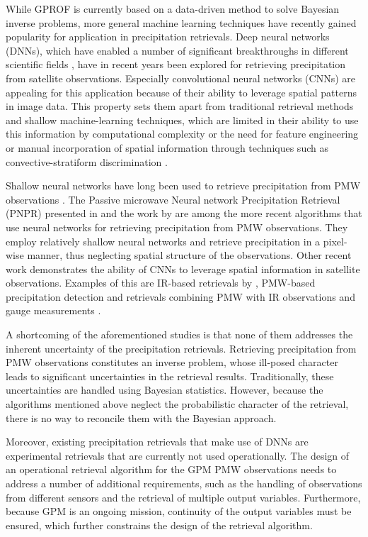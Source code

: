 \documentclass[journal abbreviation, manuscript]{copernicus}
\begin{document}
While GPROF is currently based on a data-driven method to solve Bayesian inverse
problems, more general machine learning techniques have recently gained
popularity for application in precipitation retrievals. Deep neural networks
(DNNs), which have enabled a number of significant breakthroughs in different
scientific fields \citep{silver16, jumper21}, have in recent years been explored
for retrieving precipitation from satellite observations. Especially
convolutional neural networks (CNNs) are appealing for this application because
of their ability to leverage spatial patterns in image data. This property sets
them apart from traditional retrieval methods and shallow machine-learning
techniques, which are limited in their ability to use this information by
computational complexity \citep{duncan19} or the need for feature engineering or
manual incorporation of spatial information through techniques such as
convective-stratiform discrimination \citep{kaushik10}.

Shallow neural networks have long been used to retrieve precipitation
from PMW observations \citep{staelin00, surssavadee08}. The Passive microwave
Neural network Precipitation Retrieval (PNPR) presented in \citet{sano15,
  sano16, sano18} and the work by \citet{tang18} are among the more recent
algorithms that use neural networks for retrieving precipitation from PMW
observations. They employ relatively shallow neural networks and retrieve
precipitation in a pixel-wise manner, thus neglecting spatial structure of the
observations. Other recent work demonstrates the ability of  CNNs to
leverage spatial information in  satellite observations. Examples of this are
IR-based retrievals by \citet{sadeghi19}, PMW-based precipitation detection
\citep{li21} and retrievals combining PMW with IR observations \citep{gorooh22}
and gauge measurements \citep{moraux19}.

A shortcoming of the aforementioned studies is that none of them
addresses the inherent uncertainty of the precipitation retrievals. Retrieving
precipitation from PMW observations constitutes an inverse problem, whose
ill-posed character leads to significant uncertainties in the retrieval results.
Traditionally, these uncertainties are handled using Bayesian statistics.
However, because the algorithms mentioned above neglect the probabilistic
character of the retrieval, there is no way to reconcile them with the Bayesian
approach.

Moreover, existing precipitation retrievals that make use of DNNs
\citep{moraux19, sadeghi19, li21, gorooh22} are experimental retrievals that are
currently not used operationally. The design of an operational retrieval
algorithm for the GPM PMW observations needs to address a number of additional
requirements, such as the handling of observations from different sensors and
the retrieval of multiple output variables. Furthermore, because GPM is an
ongoing mission, continuity of the output variables must be ensured, which
further constrains the design of the retrieval algorithm.
\end{document}
